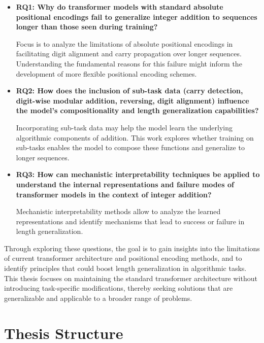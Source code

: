 \begin{itemize}
    \item \textbf{RQ1: Why do transformer models with standard absolute positional encodings fail to generalize integer addition to sequences longer than those seen during training?}
          
          Focus is to analyze the limitations of absolute positional encodings in facilitating digit alignment and carry propagation over longer sequences. Understanding the fundamental reasons for this failure might inform the development of more flexible positional encoding schemes.
          
    \item \textbf{RQ2: How does the inclusion of sub-task data (carry detection, digit-wise modular addition, reversing, digit alignment) influence the model's compositionality and length generalization capabilities?}
          
          Incorporating sub-task data may help the model learn the underlying algorithmic components of addition. This work explores whether training on sub-tasks enables the model to compose these functions and generalize to longer sequences.
          
    \item \textbf{RQ3: How can mechanistic interpretability techniques be applied to understand the internal representations and failure modes of transformer models in the context of integer addition?}
          
          Mechanistic interpretability methods allow to analyze the learned representations and identify mechanisms that lead to success or failure in length generalization.
          
\end{itemize}

Through exploring these questions, the goal is to gain insights into the limitations of current transformer architecture and positional encoding methods, and to identify principles that could boost length generalization in algorithmic tasks. This thesis focuses on maintaining the standard transformer architecture without introducing task-specific modifications, thereby seeking solutions that are generalizable and applicable to a broader range of problems.

\section{Thesis Structure}

